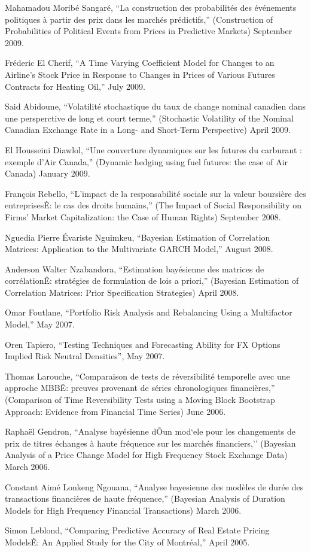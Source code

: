 \documentclass[12pt]{article}
\begin{document}
Mahamadou Morib\'e Sangar\'e,
``La construction des probabilit\'es des \'ev\'enements politiques \`a 
partir des prix dans les march\'es pr\'edictifs,''
(Construction of Probabilities of Political Events from Prices in Predictive Markets)
September 2009.

Fr\'ederic El Cherif,
``A Time Varying Coefficient Model for Changes to an Airline's Stock Price in 
Response to Changes in Prices of Various Futures Contracts for Heating Oil,''
July 2009.

Said Abidoune,
``Volatilit\'e stochastique du taux de change nominal canadien dans une persperctive de long et court terme,''
(Stochastic Volatility of the Nominal Canadian Exchange Rate in a Long- and Short-Term Perspective)
April 2009.

El Housseini Diawlol,
``Une couverture dynamiques sur les futures du carburant : exemple d'Air Canada,''
(Dynamic hedging using fuel futures: the case of Air Canada)
January 2009.

Fran\c{c}ois Rebello,
``L'impact de la responsabilit\'e sociale sur la valeur boursi\`ere des entreprisesÊ: le cas des droits humains,''
(The Impact of Social Responsibility on Firms' Market Capitalization: the Case of Human Rights)
September 2008.

Nguedia Pierre \'Evariste Nguimkeu,
``Bayesian Estimation of Correlation Matrices:
Application to the Multivariate GARCH Model,''
August 2008.

Anderson Walter Nzabandora,
``Estimation bay\'esienne des matrices de corr\'elationÊ: strat\'egies de formulation de lois a priori,''
(Bayesian Estimation of Correlation Matrices: Prior Specification Strategies)
April 2008.

Omar Foutlane,
``Portfolio Risk Analysis and Rebalancing Using a Multifactor Model,''
May 2007.

Oren Tapiero,
``Testing Techniques and Forecasting Ability for FX Options Implied Risk
Neutral Densities'',
May 2007.

Thomas Larouche,
``Comparaison de tests de r\'eversibilit\'e temporelle avec une approche MBBÊ: preuves provenant de s\'eries chronologiques financi\`eres,''
(Comparison of Time Reversibility Tests using a Moving Block Bootstrap Approach: Evidence from Financial Time Series)
June 2006.

Rapha\"el Gendron,
``Analyse bay\'esienne dÕun mod`ele pour les changements de prix de titres \'echanges \`a haute fr\'equence sur les march\'es financiers,''
(Bayesian Analysis of a Price Change Model for High Frequency Stock Exchange
Data)
March 2006.

Constant Aim\'e Lonkeng Ngouana,
``Analyse bayesienne des mod\`eles de dur\'ee des transactions financi\`eres de haute fr\'equence,''
(Bayesian Analysis of Duration Models for High Frequency Financial Transactions)
March 2006.

Simon Leblond,
``Comparing Predictive Accuracy of Real Estate Pricing ModelsÊ: An Applied Study for the City of Montr\'eal,''
April 2005.
\end{document}
